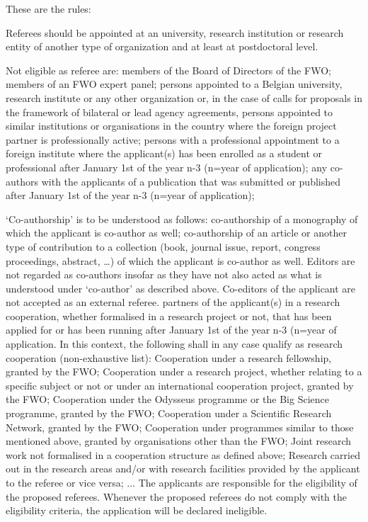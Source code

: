 \documentclass[11pt,dvipsnames,usenames,a4paper]{article}
\begin{document}
{\color{Gray}
These are the rules:

Referees should be appointed at an university, research institution or research entity of another type of organization and at least at postdoctoral level.

Not eligible as referee are:
members of the Board of Directors of the FWO;
members of an FWO expert panel;
persons appointed to a Belgian university, research institute or any other organization or, in the case of calls for proposals in the framework of bilateral or lead agency agreements, persons appointed to similar institutions or organisations in the country where the foreign project partner is professionally active;
persons with a professional appointment to a foreign institute where the applicant(s) has been enrolled as a student or professional after January 1st of the year n-3 (n=year of application);
any co-authors with the applicants of a publication that was submitted or published after January 1st of the year n-3 (n=year of application); 

‘Co-authorship’ is to be understood as follows:
co-authorship of a monography of which the applicant is co-author as well;
co-authorship of an article or another type of contribution to a collection (book, journal issue, report, congress proceedings, abstract, …) of which the applicant is co-author as well.
Editors are not regarded as co-authors insofar as they have not also acted as what is understood under ‘co-author’ as described above. Co-editors of the applicant are not accepted as an external referee.
partners of the applicant(s) in a research cooperation, whether formalised in a research project or not, that has been applied for or has been running after January 1st of the year n-3 (n=year of application. In this context, the following shall in any case qualify as research cooperation (non-exhaustive list):
Cooperation under a research fellowship, granted by the FWO;
Cooperation under a research project, whether relating to a specific subject or not or under an international cooperation project, granted by the FWO;
Cooperation under the Odysseus programme or the Big Science programme, granted by the FWO;
Cooperation under a Scientific Research Network, granted by the FWO;
Cooperation under programmes similar to those mentioned above, granted by organisations other than the FWO;
Joint research work not formalised in a cooperation structure as defined above;
Research carried out in the research areas and/or with research facilities provided by the applicant to the referee or vice versa;
...
The applicants are responsible for the eligibility of the proposed referees. Whenever the proposed referees do not comply with the eligibility criteria, the application will be declared ineligible.

}
\end{document}
